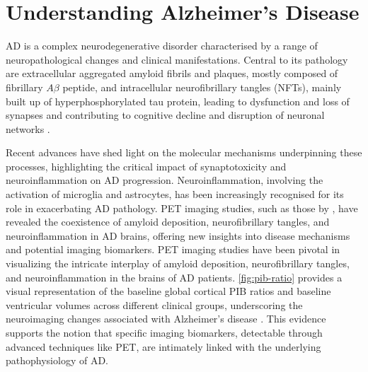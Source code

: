 \documentclass[10pt]{article}
\begin{document}
\begin{sloppypar}
  \section{Understanding Alzheimer’s Disease}
  \label{sec:alzheimers-disease}

  AD is a complex neurodegenerative disorder characterised by a range of neuropathological changes and clinical manifestations. Central to its pathology are extracellular aggregated amyloid fibrils and plaques, mostly composed of fibrillary $A\beta$ peptide, and intracellular neurofibrillary tangles (NFTs), mainly built up of hyperphosphorylated tau protein, leading to dysfunction and loss of synapses and contributing to cognitive decline and disruption of neuronal networks \citep{heneka_neuroinflammation_2015,cai_magnetic_2020}.

  Recent advances have shed light on the molecular mechanisms underpinning these processes, highlighting the critical impact of synaptotoxicity and neuroinflammation on AD progression. Neuroinflammation, involving the activation of microglia and astrocytes, has been increasingly recognised for its role in exacerbating AD pathology. PET imaging studies, such as those by \cite{zhou_pet_2021}, have revealed the coexistence of amyloid deposition, neurofibrillary tangles, and neuroinflammation in AD brains, offering new insights into disease mechanisms and potential imaging biomarkers. PET imaging studies have been pivotal in visualizing the intricate interplay of amyloid deposition, neurofibrillary tangles, and neuroinflammation in the brains of AD patients. \autoref{fig:pib-ratio} provides a visual representation of the baseline global cortical PIB ratios and baseline ventricular volumes across different clinical groups, underscoring the neuroimaging changes associated with Alzheimer's disease \citep{jack_serial_2009}. This evidence supports the notion that specific imaging biomarkers, detectable through advanced techniques like PET, are intimately linked with the underlying pathophysiology of AD.


\end{sloppypar}
\end{document}
